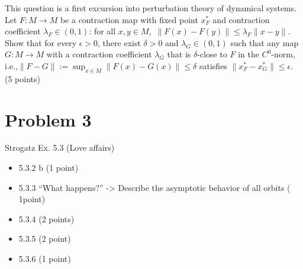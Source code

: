 \documentclass[12pt]{article}
\begin{document}
This question is a first excursion into perturbation theory of dynamical systems. Let $F:M \to M$ be a contraction map with fixed point $x_F^*$ and contraction coefficient $\lambda_F \in (0,1)$: for all $x, y \in M,$ $\|F(x)- F(y)\| \leq \lambda_F \|x-y\|.$ Show that for every $\epsilon >0$, there exist $\delta >0$ and $\lambda_G \in (0,1)$ such that any map $G: M\to M$ with a contraction coefficient $\lambda_G$ that is $\delta$-close to $F$ in the $C^0$-norm, i.e.,$\|F - G\| := \sup_{x \in M} \|F(x) - G(x)\| \leq \delta$ satisfies $\|x_F^* - x_G^*\|\leq \epsilon.$    (5 points)

\section*{Problem 3}

Strogatz Ex. 5.3 (Love affairs)
\begin{itemize}
	\item 5.3.2 b (1 point)
	\item 5.3.3 ``What happens?'' -> Describe the asymptotic behavior of all orbits ( 1point)
	\item 5.3.4 (2 points)
	\item 5.3.5 (2 point)
	\item 5.3.6 (1 point)
\end{itemize}
\end{document}
